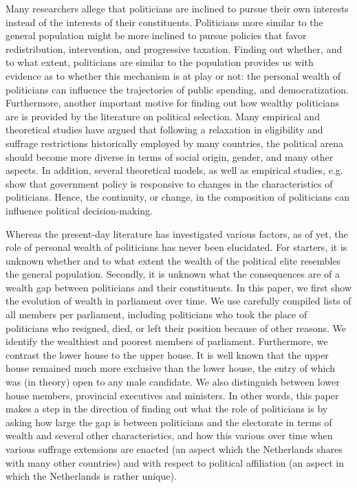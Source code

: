     Many researchers allege that politicians are inclined to pursue their own interests instead of the interests of their constituents. \autocite{lizzeri2004did, duggan2017political, corvalan2020political} Politicians more similar to the general population might be more inclined to pursue policies that favor redistribution, intervention, and progressive taxation. Finding out whether, and to what extent, politicians are similar to the population provides us with evidence as to whether this mechanism is at play or not: the personal wealth of politicians can influence the trajectories of public spending, and democratization. Furthermore, another important motive for finding out how wealthy politicians are is provided by the literature on political selection. Many empirical and theoretical studies have argued that following a relaxation in eligibility and suffrage restrictions historically employed by many countries, the political arena should  become more diverse in terms of social origin, gender, and many other aspects.\autocite{besley1997economic, besley2005political, bernini2018race} In addition, several theoretical models, as well as empirical studies, e.g.  show that government policy is responsive to changes in the characteristics of politicians. \autocite{meltzer1981rational, besley2011educated, chattopadhyay2004women, hayo2014political} Hence, the continuity, or change, in the composition of politicians can influence political decision-making. 

    Whereas the present-day literature has investigated various factors, as of yet, the role of personal wealth of politicians has never been elucidated. For starters, it is unknown whether and to what extent the wealth of the political elite resembles the general population. Secondly, it is unknown what the consequences are of a wealth gap between politicians and their constituents. In this paper, we first show the evolution of wealth in parliament over time. We use carefully compiled lists of all members per parliament, including politicians who took the place of politicians who resigned, died, or left their position because of other reasons. We identify the wealthiest and poorest members of parliament. Furthermore, we contrast the lower house to the upper house. It is well known that the upper house remained much more exclusive than the lower house, the entry of which was (in theory) open to any male candidate. \autocite{van1983toegang} We also distinguish between lower house members, provincial executives and ministers. In other words, this paper makes a step in the direction of finding out what the role of politicians is by asking how large the gap is between politicians and the electorate in terms of wealth and several other characteristics, and how this various over time when various suffrage extensions are enacted (an aspect which the Netherlands shares with many other countries) and with respect to political affiliation (an aspect in which the Netherlands is rather unique). 

